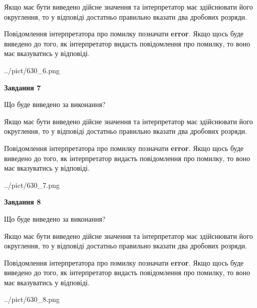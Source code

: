 \documentclass[12pt, ukrainian]{article}
\begin{document}
{\begin {Large}
Якщо має бути виведено дійсне значення та інтерпретатор має здійснювати його округлення, 
то у відповіді достатньо правильно вказати два дробових розряди.

Повідомлення інтерпретатора про помилку позначати \textbf{error}.
Якщо щось буде виведено до того, як інтерпретатор видасть повідомлення про помилку, 
то воно має вказуватись у відповіді. \par

\begin{center}
	{../pict/630_6.png}
\end{center}
\newpage

{\begin {center}\textbf{Завдання 7}\end {center}}\par
Що буде виведено за виконання? \par

Якщо має бути виведено дійсне значення та інтерпретатор має здійснювати його округлення, 
то у відповіді достатньо правильно вказати два дробових розряди.

Повідомлення інтерпретатора про помилку позначати \textbf{error}.
Якщо щось буде виведено до того, як інтерпретатор видасть повідомлення про помилку, 
то воно має вказуватись у відповіді. \par

\begin{center}
	{../pict/630_7.png}
\end{center}
\newpage

{\begin {center}\textbf{Завдання 8}\end {center}}\par
Що буде виведено за виконання? \par

Якщо має бути виведено дійсне значення та інтерпретатор має здійснювати його округлення, 
то у відповіді достатньо правильно вказати два дробових розряди.

Повідомлення інтерпретатора про помилку позначати \textbf{error}.
Якщо щось буде виведено до того, як інтерпретатор видасть повідомлення про помилку, 
то воно має вказуватись у відповіді. \par

\begin{center}
	{../pict/630_8.png}
\end{center}
\newpage


\end{Large}}
\end{document}

